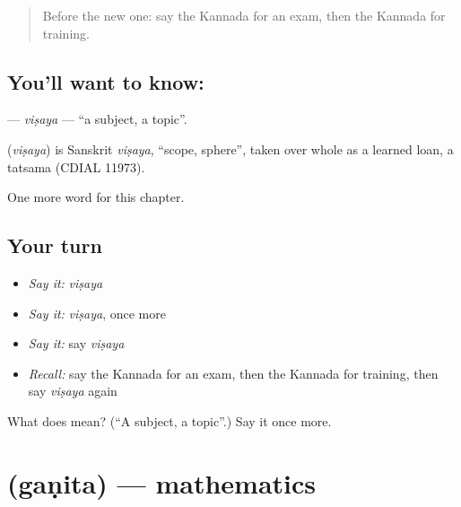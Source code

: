 \label{lesson:KA-C304-visaya}



\begin{quote}
Before the new one: say the Kannada for an exam, then the Kannada for training.
\end{quote}

\subsection*{You'll want to know: }
\textbf{} — \emph{viṣaya} — \textquotedblleft{}a subject, a topic\textquotedblright{}.

\begin{cousinweb}
\textbf{} (\emph{viṣaya}) is Sanskrit \emph{viṣaya}, \textquotedblleft{}scope, sphere\textquotedblright{}, taken over whole as a learned loan, a tatsama (CDIAL 11973).
\end{cousinweb}

\begin{grammarlens}[title={What you've built}]
One more word for this chapter.
\end{grammarlens}

\subsection*{Your turn}
\begin{itemize}
\raggedright
  \item \emph{Say it:} \emph{viṣaya}
  \item \emph{Say it:} \emph{viṣaya}, once more
  \item \emph{Say it:} say \emph{viṣaya}
  \item \emph{Recall:} say the Kannada for an exam, then the Kannada for training, then say \emph{viṣaya} again
\end{itemize}

\begin{tcolorbox}[breakable,colback=teal!4,colframe=teal!35!black,title={Before you move on}]
What does  mean? (\textquotedblleft{}A subject, a topic\textquotedblright{}.) Say it once more.
\end{tcolorbox}
\section[\texorpdfstring{\kn{ಗಣಿತ} (gaṇita)}{ಗಣಿತ (gaṇita)}]{ (gaṇita) — mathematics}

\label{lesson:KA-C304-ganita}



